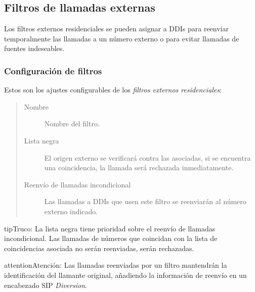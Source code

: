\documentclass[letterpaper,10pt,spanish]{sphinxmanual}
\begin{document}
\subsection{Filtros de llamadas externas}
\label{administration_portal/client/residential/external_call_filters:external-call-filters}\label{administration_portal/client/residential/external_call_filters:residential-filters}\label{administration_portal/client/residential/external_call_filters::doc}
Los filtros externos residenciales se pueden asignar a DDIs para reenviar temporalmente las llamadas a un número externo o para evitar llamadas de fuentes indeseables.


\subsubsection{Configuración de filtros}
\label{administration_portal/client/residential/external_call_filters:filters-configuration}
Estos son los ajustes configurables de los \emph{filtros externos residenciales}:
\begin{quote}
\begin{description}
\item[{Nombre}] \leavevmode
Nombre del filtro.

\item[{Lista negra}] \leavevmode
El origen externo se verificará contra las {\hyperref[administration_portal/client/vpbx/routing_tools/match_lists:match\string-lists]{}} asociadas, si se encuentra una coincidencia, la llamada será rechazada inmediatamente.

\item[{Reenvío de llamadas incondicional}] \leavevmode
Las llamadas a DDIs que usen este filtro se reenviarán al número externo indicado.

\end{description}
\end{quote}

\begin{notice}{tip}{Truco:}
La lista negra tiene prioridad sobre el reenvío de llamadas incondicional. Las llamadas de números que coincidan con la lista de coincidencias asociada no serán reenviadas, serán rechazadas.
\end{notice}

\begin{notice}{attention}{Atención:}
Las llamadas reenviadas por un filtro mantendrán la identificación del llamante original, añadiendo la información de reenvío en un encabezado SIP \emph{Diversion}.
\end{notice}
\end{document}
